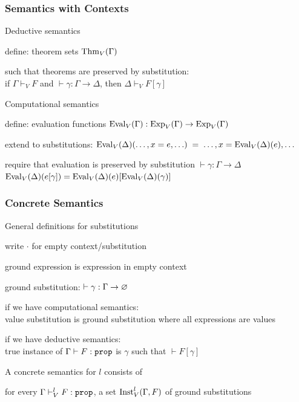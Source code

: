\begin{frame}\frametitle{Semantics with Contexts}
\begin{blockitems}{Deductive semantics}
\item define: theorem sets $\mathrm{Thm}_V(\Gamma)$
\item such that theorems are preserved by substitution: \\
 if $\Gamma\vdash_V F$ and $\vdash \gamma:\Gamma\to\Delta$, then $\Delta\vdash_V F[\gamma]$
\end{blockitems}

\begin{blockitems}{Computational semantics}
\item define: evaluation functions $\mathrm{Eval}_V(\Gamma):\mathrm{Exp}_V(\Gamma)\to\mathrm{Exp}_V(\Gamma)$
\item extend to substitutions: $\mathrm{Eval}_V(\Delta)(\ldots,x=e,\ldots)\;=\;\ldots,x=\mathrm{Eval}_V(\Delta)(e), \ldots$
\item require that evaluation is preserved by substitution $\vdash \gamma:\Gamma\to\Delta$ \\
  $\mathrm{Eval}_V(\Delta)(e[\gamma])=\mathrm{Eval}_V(\Delta)(e)[\mathrm{Eval}_V(\Delta)(\gamma)]$
\end{blockitems}
\end{frame}

\begin{frame}\frametitle{Concrete Semantics}
\begin{blockitems}{General definitions for substitutions}
\item write $\cdot$ for empty context/substitution
\item ground expression is expression in empty context
\item ground substitution: $\vdash \gamma:\Gamma\to \varnothing$
\item if we have computational semantics: \\ value substitution is ground substitution where all expressions are values
\item if we have deductive semantics: \\
 true instance of $\Gamma\vdash F:\mathtt{prop}$ is $\gamma$ such that $\vdash F[\gamma]$
\end{blockitems}

\begin{blockitems}{A concrete semantics for $l$ consists of}
\item for every $\Gamma\vdash^l_V F:\mathtt{prop}$, a set $\mathrm{Inst}^l_V(\Gamma,F)$ of ground substitutions
\end{blockitems}
\end{frame}

